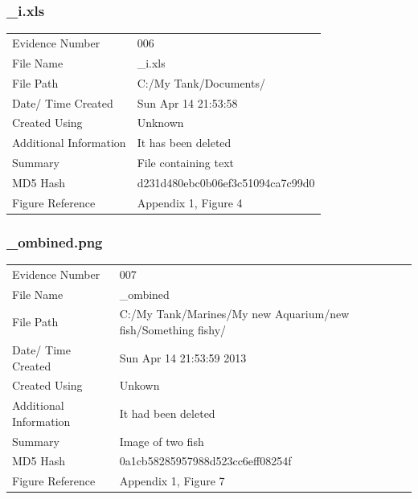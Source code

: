 \documentclass[12pt]{article}
\begin{document}
				\subsubsection{\_i.xls}
					\begin{tabular}{l | p{8cm}}
						Evidence Number & 006  \\
			    			File Name & \_i.xls \\
			      			File Path & C:/My Tank/Documents/ \\
						Date/ Time Created & Sun Apr 14 21:53:58 \\
						Created Using & Unknown \\
						Additional Information & It has been deleted \\
						Summary & File containing text \\
						MD5 Hash & d231d480ebc0b06ef3c51094ca7c99d0 \\
						Figure Reference &  Appendix 1, Figure 4\\
					\end{tabular}

				\subsubsection{\_ombined.png}
					\begin{tabular}{l | p{8cm}}
						Evidence Number & 007  \\
			    			File Name & \_ombined  \\
			      			File Path & C:/My Tank/Marines/My new Aquarium/new fish/Something fishy/  \\
						Date/ Time Created & Sun Apr 14 21:53:59 2013 \\
						Created Using & Unkown \\
						Additional Information & It had been deleted \\
						Summary & Image of two fish\\
						MD5 Hash & 0a1cb58285957988d523cc6eff08254f\\
						Figure Reference &  Appendix 1, Figure 7\\
					\end{tabular}
\end{document}
